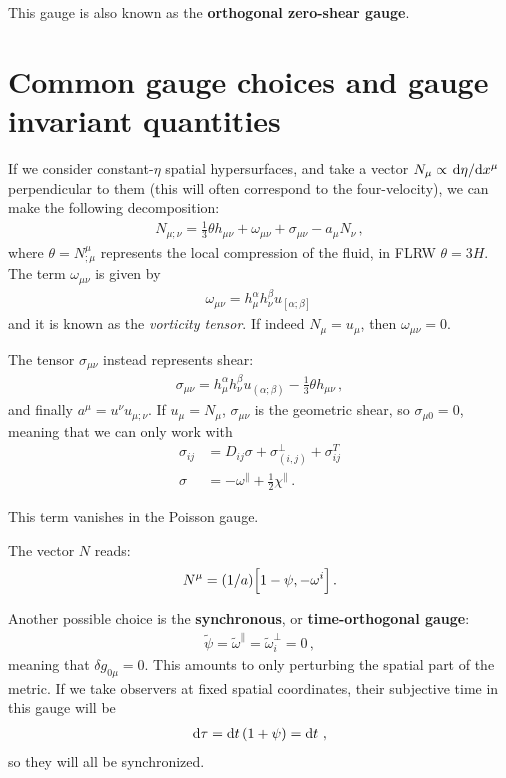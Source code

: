 \documentclass[main.tex]{subfiles}
\begin{document}
This gauge is also known as the \textbf{orthogonal zero-shear gauge}.

\section{Common gauge choices and gauge invariant quantities}

If we consider constant-\(\eta \) spatial hypersurfaces, and take a vector \(N_\mu \propto \dv*{\eta }{x^{\mu }}\) perpendicular to them (this will often correspond to the four-velocity), we can make the following decomposition: 
%
\begin{align}
N_{\mu ; \nu } = \frac{1}{3} \theta h_{\mu \nu } + \omega_{\mu \nu } + \sigma_{\mu \nu } - a_\mu N_\nu 
\,,
\end{align}
%
where \(\theta = N^{\mu }_{;\mu }\) represents the local compression of the fluid, in FLRW \(\theta = 3 H\).
The term \(\omega_{\mu \nu }\) is given by 
%
\begin{align}
\omega_{\mu \nu } =  h^{\alpha }_{\mu } h^{\beta }_{\nu } u_{[\alpha ; \beta ]}
\,
\end{align}
%
and it is known as the \emph{vorticity tensor}. 
If indeed \(N_\mu = u_\mu \), then \(\omega_{\mu \nu } = 0\). 

The tensor \(\sigma_{\mu \nu }\) instead represents shear:
%
\begin{align}
\sigma_{\mu \nu } =   h^{\alpha }_{\mu } h^{\beta }_{\nu } u_{(\alpha ; \beta )} - \frac{1}{3} \theta h_{\mu \nu }
\,,
\end{align}
%
and finally \(a^{\mu } = u^{\nu } u_{\mu ; \nu }\).
If \(u_{\mu} = N_\mu\), \(\sigma_{\mu \nu } \) is the geometric shear, so \(\sigma_{\mu 0} = 0\), meaning that we can only work with 
%
\begin{align} \label{eq:zero-shear-gauge}
\sigma_{ij} &= D_{ij} \sigma + \sigma^{\perp}_{(i, j)} + \sigma^{T}_{ij}  \\
\sigma &= - \omega^{\parallel} + \frac{1}{2} \chi^{\parallel}
\,.
\end{align}

This term vanishes in the Poisson gauge.

The vector \(N\) reads:
%
\begin{align}
 N^{\mu } =(1/a) \qty[1 - \psi,  - \omega^{i}]
\,.
\end{align}
%

Another possible choice is the \textbf{synchronous}, or \textbf{time-orthogonal gauge}: 
%
\begin{align}
\widetilde{\psi} = \widetilde{\omega}^{\parallel} = \widetilde{\omega}^{\perp}_i = 0
\,,
\end{align}
%
meaning that \(\delta g_{0\mu } = 0 \). 
This amounts to only perturbing the spatial part of the metric.
If we take observers at fixed spatial coordinates, their subjective time in this gauge will be 
%
\begin{align}
\dd{\tau } = \dd{t} \qty(1 + \psi ) = \dd{t}
\,,
\end{align}
%
so they will all be synchronized. 
\end{document}
